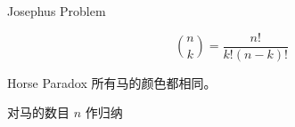 \begin{frame}{}
\end{frame}

\begin{frame}{}
\end{frame}

\begin{frame}{}
  \begin{exampleblock}{Josephus Problem}
  \end{exampleblock}
\end{frame}

\begin{frame}{}
  \begin{exampleblock}{}
    \[
      \binom{n}{k} = \frac{n!}{k! (n-k)!}
    \]
  \end{exampleblock}
\end{frame}

\begin{frame}{}
  \begin{exampleblock}{Horse Paradox}
    所有马的颜色都相同。
  \end{exampleblock}

  \pause
  \vspace{0.50cm}
  \begin{center}
    对马的数目 $n$ 作归纳

    \pause
  \end{center}
\end{frame}
